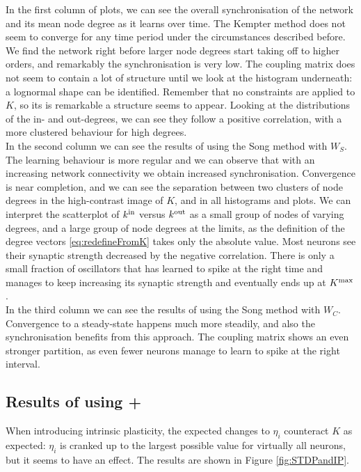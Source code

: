 In the first column of plots, we can see the overall synchronisation of the network and its mean node degree as it learns over time. The Kempter method does not seem to converge for any time period under the circumstances described before. We find the network right before larger node degrees start taking off to higher orders, and remarkably the synchronisation is very low.
The coupling matrix does not seem to contain a lot of structure until we look at the histogram underneath: a lognormal shape can be identified. Remember that no constraints are applied to $K$, so its is remarkable a structure seems to appear. Looking at the distributions of the in- and out-degrees, we can see they follow a positive correlation, with a more clustered behaviour for high degrees. \\

In the second column we can see the results of using the Song method with $W_S$. The learning behaviour is more regular and we can observe that with an increasing network connectivity we obtain increased synchronisation. Convergence is near completion, and we can see the separation between two clusters of node degrees in the high-contrast image of $K$, and in all histograms and plots. We can interpret the scatterplot of ${k^{\rm in}}$ versus ${k^{\rm out}}$ as a small group of nodes of varying degrees, and a large group of node degrees at the limits, as the definition of the degree vectors \eqref{eq:redefineFromK} takes only the absolute value. Most neurons see their synaptic strength decreased by the negative correlation. There is only a small fraction of oscillators that has learned to spike at the right time and manages to keep increasing its synaptic strength and eventually ends up at $K^{\rm max}$. \\%

In the third column we can see the results of using the Song method with $W_C$. Convergence to a steady-state happens much more steadily, and also the synchronisation benefits from this approach. The coupling matrix shows an even stronger partition, as even fewer neurons manage to learn to spike at the right interval.



\subsection{Results of using \STDP + \IP}
When introducing intrinsic plasticity, the expected changes to $\eta_i$ counteract $K$ as expected: $\eta_i$ is cranked up to the largest possible value for virtually all neurons, but it seems to have an effect. The results are shown in Figure \ref{fig:STDPandIP}. \\

